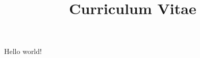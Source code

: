 \documentclass[a4paper]{curve}
\title{Curriculum Vitae}
\begin{document}
\par Hello world!
\end{document}
